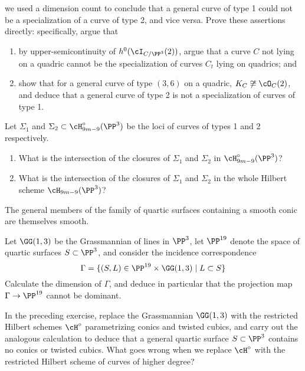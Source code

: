 \begin{exercise}
 we used a dimension count to conclude that a general curve of type 1 could not be a specialization of a curve of type 2, and vice versa. Prove these assertions directly: specifically, argue that
\begin{enumerate}
\item by upper-semicontinuity of $h^0(\cI_{C/\PP^3}(2))$, argue that a curve $C$ not lying on a quadric cannot be the specialization of curves $C_t$ lying on quadrics; and
\item show that for a general curve of type $(3,6)$ on a quadric, $K_C \not\cong \cO_C(2)$, and deduce that a general curve of type 2 is not a specialization of curves of type 1.
\end{enumerate}
\end{exercise}

\begin{exercise}
Let $\Sigma_1$ and $\Sigma_2 \subset \cH^\circ_{9m-9}(\PP^3)$ be the loci of curves of types 1 and 2 respectively. 
\begin{enumerate}
\item What is the intersection of the closures of $\Sigma_1$ and $\Sigma_2$ in $\cH^\circ_{9m-9}(\PP^3)$?
\item What is the intersection of the closures of $\Sigma_1$ and $\Sigma_2$ in the whole Hilbert scheme $\cH_{9m-9}(\PP^3)$?
\end{enumerate}
\end{exercise}

\begin{exercise}\label{smooth quartic surfaces}
The general members of the family of quartic surfaces containing a smooth conic are themselves smooth. 
\end{exercise}

\begin{exercise}\label{lines on quartic}
Let $\GG(1,3)$ be the Grassmannian of lines in $\PP^3$, let $\PP^{19}$ denote the space of quartic surfaces $S \subset \PP^3$, and consider the incidence correspondence
$$
\Gamma = \{ (S, L) \in \PP^{19} \times \GG(1,3) \mid L \subset S \}
$$
Calculate the dimension of $\Gamma$, and deduce in particular that the projection map $\Gamma \to \PP^{19}$ cannot be dominant.
\end{exercise} 


\begin{exercise}\label{conics on quartic} In the preceding exercise, replace the Grassmannian $\GG(1,3)$ with the restricted Hilbert schemes $\cH^\circ$ parametrizing conics and twisted cubics, and carry out the analogous calculation to deduce that a general quartic surface $S \subset \PP^3$ contains no conics or twisted cubics. What goes wrong when we replace $\cH^\circ$ with the restricted Hilbert scheme of curves of higher degree?
\end{exercise} 

